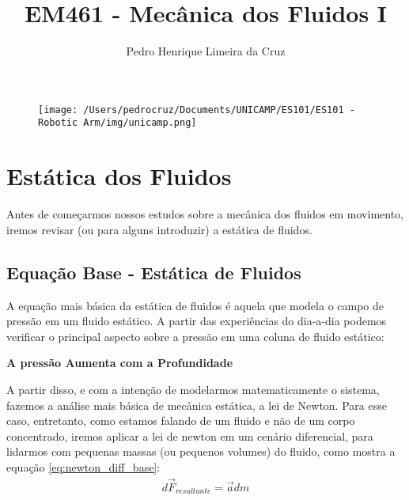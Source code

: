 \documentclass{article}
\author{Pedro Henrique Limeira da Cruz}
\title{EM461 - Mecânica dos Fluidos I}
\begin{document}
    \maketitle
    \thispagestyle{empty}

    \begin{figure}[h]
        \begin{center}
            \texttt{[image: /Users/pedrocruz/Documents/UNICAMP/ES101/ES101 - Robotic Arm/img/unicamp.png]}
        \end{center}
    \end{figure}

    \newpage
    \tableofcontents
    \newpage

    \section{Estática dos Fluidos}
        Antes de começarmos nossos estudos sobre a mecânica dos fluidos em movimento, iremos revisar (ou para alguns introduzir) a estática de fluidos. 

        \subsection{Equação Base - Estática de Fluidos}
            A equação mais básica da estática de fluidos é aquela que modela o campo de pressão em um fluido estático. A partir das experiências do dia-a-dia podemos verificar o principal aspecto
            sobre a pressão em uma coluna de fluido estático: 

            \begin{center}
                \textbf{A pressão Aumenta com a Profundidade}
            \end{center}

            A partir disso, e com a intenção de modelarmos matematicamente o sistema, fazemos a análise mais básica de mecânica estática, a lei de Newton. Para esse caso, entretanto, como estamos
            falando de um fluido e não de um corpo concentrado, iremos aplicar a lei de newton em um cenário diferencial, para lidarmos com pequenas massas (ou pequenos volumes) do fluido, como mostra a equação \ref{eq:newton_diff_base}:
            \begin{align}
                d\vec{F}_{resultante}= \vec a dm \label{eq:newton_diff_base}
            \end{align}
\end{document}

